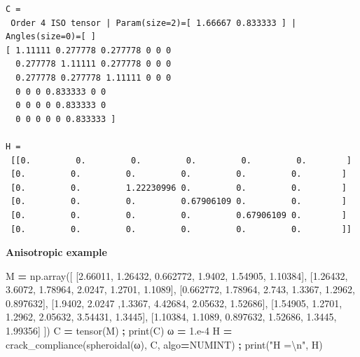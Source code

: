 \documentclass[
  a4paper,
  numbers=noendperiod,
  DIV=12]{scrreprt}
\newenvironment{Shaded}{\begin{snugshade}}{\end{snugshade}}
\newcommand{\BuiltInTok}[1]{#1}
\newcommand{\CharTok}[1]{\textcolor[rgb]{0.31,0.60,0.02}{#1}}
\newcommand{\FloatTok}[1]{\textcolor[rgb]{0.00,0.00,0.81}{#1}}
\newcommand{\NormalTok}[1]{#1}
\newcommand{\OperatorTok}[1]{\textcolor[rgb]{0.81,0.36,0.00}{\textbf{#1}}}
\newcommand{\StringTok}[1]{\textcolor[rgb]{0.31,0.60,0.02}{#1}}
\begin{document}
\begin{verbatim}
C =
 Order 4 ISO tensor | Param(size=2)=[ 1.66667 0.833333 ] | Angles(size=0)=[ ]
[ 1.11111 0.277778 0.277778 0 0 0 
  0.277778 1.11111 0.277778 0 0 0 
  0.277778 0.277778 1.11111 0 0 0 
  0 0 0 0.833333 0 0 
  0 0 0 0 0.833333 0 
  0 0 0 0 0 0.833333 ]

H =
 [[0.         0.         0.         0.         0.         0.        ]
 [0.         0.         0.         0.         0.         0.        ]
 [0.         0.         1.22230996 0.         0.         0.        ]
 [0.         0.         0.         0.67906109 0.         0.        ]
 [0.         0.         0.         0.         0.67906109 0.        ]
 [0.         0.         0.         0.         0.         0.        ]]
\end{verbatim}

\textbf{Anisotropic example}

\begin{Shaded}
\begin{Highlighting}[]
\NormalTok{M }\OperatorTok{=}\NormalTok{ np.array([ [}\FloatTok{2.66011}\NormalTok{, }\FloatTok{1.26432}\NormalTok{, }\FloatTok{0.662772}\NormalTok{, }\FloatTok{1.9402}\NormalTok{, }\FloatTok{1.54905}\NormalTok{, }\FloatTok{1.10384}\NormalTok{],}
\NormalTok{               [}\FloatTok{1.26432}\NormalTok{, }\FloatTok{3.6072}\NormalTok{, }\FloatTok{1.78964}\NormalTok{, }\FloatTok{2.0247}\NormalTok{, }\FloatTok{1.2701}\NormalTok{, }\FloatTok{1.1089}\NormalTok{], }
\NormalTok{               [}\FloatTok{0.662772}\NormalTok{, }\FloatTok{1.78964}\NormalTok{, }\FloatTok{2.743}\NormalTok{, }\FloatTok{1.3367}\NormalTok{, }\FloatTok{1.2962}\NormalTok{, }\FloatTok{0.897632}\NormalTok{], }
\NormalTok{               [}\FloatTok{1.9402}\NormalTok{, }\FloatTok{2.0247}\NormalTok{ ,}\FloatTok{1.3367}\NormalTok{, }\FloatTok{4.42684}\NormalTok{, }\FloatTok{2.05632}\NormalTok{, }\FloatTok{1.52686}\NormalTok{], }
\NormalTok{               [}\FloatTok{1.54905}\NormalTok{, }\FloatTok{1.2701}\NormalTok{, }\FloatTok{1.2962}\NormalTok{, }\FloatTok{2.05632}\NormalTok{, }\FloatTok{3.54431}\NormalTok{, }\FloatTok{1.3445}\NormalTok{], }
\NormalTok{               [}\FloatTok{1.10384}\NormalTok{, }\FloatTok{1.1089}\NormalTok{, }\FloatTok{0.897632}\NormalTok{, }\FloatTok{1.52686}\NormalTok{, }\FloatTok{1.3445}\NormalTok{, }\FloatTok{1.99356}\NormalTok{] ])}
\NormalTok{C }\OperatorTok{=}\NormalTok{ tensor(M) }\OperatorTok{;} \BuiltInTok{print}\NormalTok{(C)}
\NormalTok{ω }\OperatorTok{=} \FloatTok{1.e{-}4}
\NormalTok{H }\OperatorTok{=}\NormalTok{ crack\_compliance(spheroidal(ω), C, algo}\OperatorTok{=}\NormalTok{NUMINT) }\OperatorTok{;} \BuiltInTok{print}\NormalTok{(}\StringTok{"H =}\CharTok{\textbackslash{}n}\StringTok{"}\NormalTok{, H)}
\end{Highlighting}
\end{Shaded}
\end{document}
